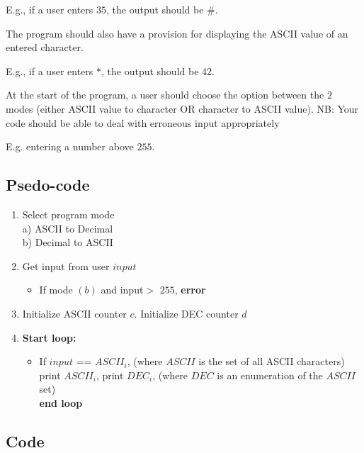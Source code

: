 \documentclass[]{article}
\begin{document}
\centering
E.g., if a user enters $35$, the output should be $\#$.

\justify
The program should also have a provision
for displaying the ASCII value of an entered character.

\centering
E.g., if a user enters $*$, the output
should be 42.

\justify
At the start of the program, a user should choose the option between the $2$
modes (either ASCII value to character OR character to ASCII value).
NB: Your code should be able to deal with erroneous input appropriately

\centering
E.g. entering a number above $255$.

\justify

\subsection{Psedo-code}

\begin{enumerate}
	\item Select program mode \\
	\hspace*{3em} a) ASCII to Decimal \\
	\hspace*{3em} b) Decimal to ASCII \\
	\item Get input from user $input$
	\begin{itemize}
		\item If mode $(b)$ and input$ >$ $255$, \textbf{error}
	\end{itemize}
	
	\item Initialize ASCII counter $c$. Initialize DEC counter $d$
	
	\item \textbf{Start loop:}
	\begin{itemize}
	\item If $input$ == $ASCII_{i}$, (where $ASCII$ is the set of all ASCII characters) \\
	\hspace*{6em} print $ASCII_i$, print $DEC_i$, (where $DEC$ is an enumeration of the $ASCII$ set) \\
	\textbf{end loop}
	
	\end{itemize}

\end{enumerate}

\subsection{Code} \label{sketch 2}

\end{document}
